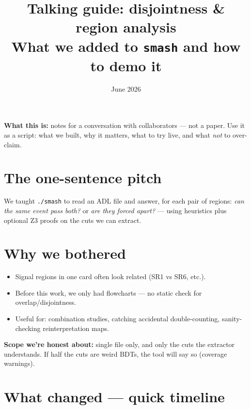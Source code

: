 \documentclass[11pt,a4paper]{article}
\title{\textbf{Talking guide: disjointness \& region analysis}\\[0.3em]
\large What we added to \texttt{smash} and how to demo it}
\author{}
\date{June 2026}
\begin{document}
\maketitle

\noindent\textbf{What this is:} notes for a conversation with collaborators --- not a paper.
Use it as a script: what we built, why it matters, what to try live, and what \emph{not}
to over-claim.

\tableofcontents
\newpage

\section{The one-sentence pitch}

We taught \texttt{./smash} to read an ADL file and answer, for each pair of regions:
\emph{can the same event pass both?} or \emph{are they forced apart?} --- using
heuristics plus optional Z3 proofs on the cuts we can extract.

\section{Why we bothered}

\begin{itemize}
  \item Signal regions in one card often look related (SR1 vs SR6, etc.).
  \item Before this work, we only had flowcharts --- no static check for overlap/disjointness.
  \item Useful for: combination studies, catching accidental double-counting, sanity-checking
        reinterpretation maps.
\end{itemize}

\textbf{Scope we're honest about:} single file only, and only the cuts the extractor
understands. If half the cuts are weird BDTs, the tool will say so (coverage warnings).

\section{What changed --- quick timeline}
\end{document}
